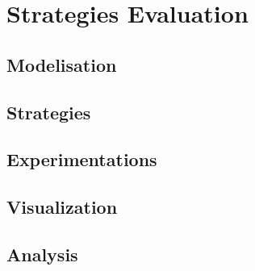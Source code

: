 \chapter{Strategies Evaluation}
\label{chap:strategies}

\section{Modelisation}
\section{Strategies}
\section{Experimentations}
\section{Visualization}
\section{Analysis}
